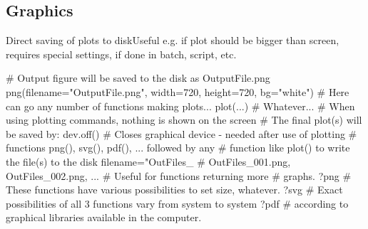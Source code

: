 \documentclass[compress, ucs, xelatex, 11pt, xcolor=svgnames,
	hyperref={
		bookmarks=true,
		unicode=true,
		colorlinks=true,
		pdftitle={Molecular data in R},
		plainpages=false,
		pdfauthor={Vojtech Zeisek},
		pdfsubject={Course about phylogeny and evolution in R},
		pdfcreator={XeLaTeX},
		pdfkeywords={R, evolution, phylogeny, molecular data},
		linkcolor=Tomato,
		anchorcolor=SaddleBrown,
		citecolor=Goldenrod,
		filecolor=DarkMagenta,
		menucolor=Sienna,
		urlcolor=DarkTurquoise,
		pdftex},
	url={hyphens, lowtilde} %
	]{beamer}
\begin{document}
\subsection{Graphics}

\begin{frame}[fragile]{Direct saving of plots to disk}{Useful e.g. if plot should be bigger than screen, requires special settings, if done in batch, script, etc.}
	\begin{spluscode}
    # Output figure will be saved to the disk as OutputFile.png
    png(filename="OutputFile.png", width=720, height=720, bg="white")
    # Here can go any number of functions making plots...
    plot(...) # Whatever...
    # When using plotting commands, nothing is shown on the screen
    # The final plot(s) will be saved by:
    dev.off() # Closes graphical device - needed after use of plotting
              # functions png(), svg(), pdf(), ... followed by any
              # function like plot() to write the file(s) to the disk
    filename="OutFiles_%
                                 # OutFiles_001.png, OutFiles_002.png, ...
                                 # Useful for functions returning more
                                 # graphs.
    ?png # These functions have various possibilities to set size, whatever.
    ?svg # Exact possibilities of all 3 functions vary from system to system
    ?pdf # according to graphical libraries available in the computer.
	\end{spluscode}
\end{frame}
\end{document}
